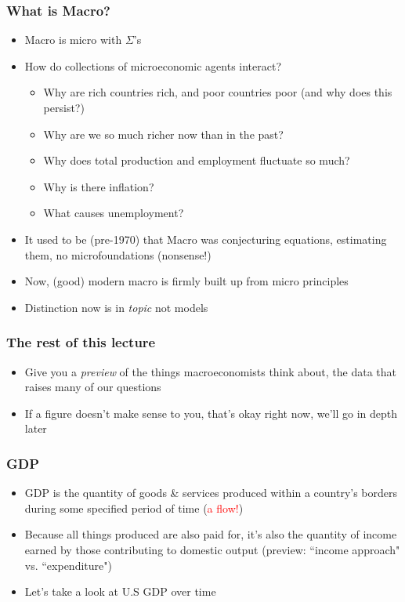 \documentclass{beamer}
\author{Trevor S. Gallen}
\date{}
\begin{document}
\renewcommand*{\inserttotalframenumber}{\pageref{lastframe}}



\begin{frame}
\titlepage
\end{frame}

\begin{frame}
\frametitle[alignment=center]{What is Macro?}
\begin{itemize}
\item Macro is micro with $\Sigma$'s
\bigskip
\item How do collections of microeconomic agents interact?
\bigskip
\begin{itemize}
\item Why are rich countries rich, and poor countries poor (and why does this persist?)
\bigskip
\item Why are we so much richer now than in the past?
\bigskip
\item Why does total production and employment fluctuate so much?
\bigskip
\item Why is there inflation?
\bigskip
\item What causes unemployment?
\end{itemize}
\item It used to be (pre-1970) that Macro was conjecturing equations, estimating them, no microfoundations (nonsense!)
\bigskip
\item Now, (good) modern macro is firmly built up from micro principles
\bigskip
\item Distinction now is in \emph{topic} not models
\end{itemize}
\end{frame}

\begin{frame}
\frametitle[alignment=center]{The rest of this lecture}
\begin{itemize}
\item Give you a \emph{preview} of the things macroeconomists think about, the data that raises many of our questions
\bigskip
\item If a figure doesn't make sense to you, that's okay right now, we'll go in depth later
\end{itemize}
\end{frame}

\begin{frame}
\frametitle[alignment=center]{GDP}
\begin{itemize}
\item GDP is the quantity of goods \& services produced within a country's borders during some specified period of time (\textcolor{red}{a flow!})
\bigskip
\item Because all things produced are also paid for, it's also the quantity of income earned by those contributing to domestic output (preview: ``income approach" vs. ``expenditure")
\bigskip
\item Let's take a look at U.S GDP over time
\end{itemize}
\end{frame}
\end{document}

